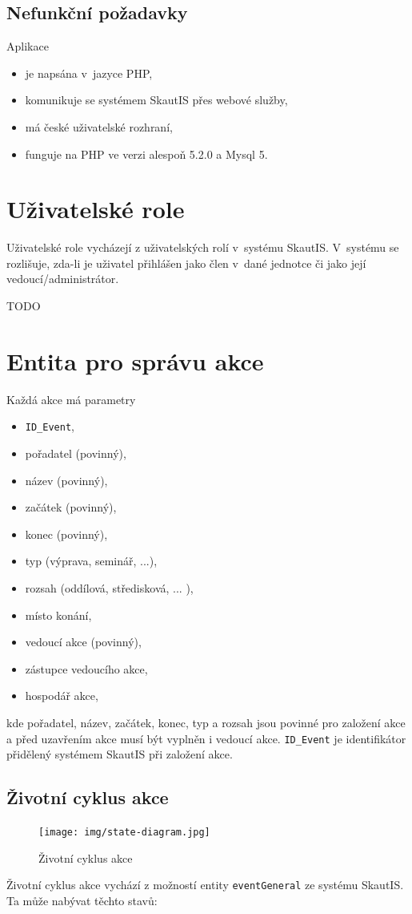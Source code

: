 \documentclass[thesis=B,czech]{FITthesis}[2011/06/14]
\begin{document}
\subsection{Nefunkční požadavky}
Aplikace 
\begin{itemize}
	\item je napsána v~jazyce PHP,
	\item komunikuje se systémem SkautIS přes webové služby,
	\item má české uživatelské rozhraní,
	\item funguje na PHP ve verzi alespoň 5.2.0 a Mysql 5.
\end{itemize}

\section{Uživatelské role}
Uživatelské role vycházejí z uživatelských rolí v~systému SkautIS. V~systému se rozlišuje, zda-li je uživatel přihlášen jako člen v~dané jednotce či jako její vedoucí/administrátor.

TODO

\section{Entita pro správu akce}
\label{sec:eventDescription}
Každá akce má parametry
\begin{itemize}
	\item \texttt{ID\_Event},
	\item pořadatel (povinný),
	\item název (povinný),
	\item začátek (povinný),
	\item konec (povinný),
	\item typ (výprava, seminář, ...),
	\item rozsah (oddílová, středisková, ... ),
	\item místo konání,
	\item vedoucí akce (povinný),
	\item zástupce vedoucího akce,
	\item hospodář akce,
\end{itemize}
kde pořadatel, název, začátek, konec, typ a rozsah jsou povinné pro založení akce a před uzavřením akce musí být vyplněn i vedoucí akce. \texttt{ID\_Event} je identifikátor přidělený systémem SkautIS při založení akce.

\subsection{Životní cyklus akce}
 \begin{figure}[h] \centering
 	\texttt{[image: img/state-diagram.jpg]}
 	\caption[Životní cyklus akce]{Životní cyklus akce}\label{fig:state-diagram}
 \end{figure}
 Životní cyklus akce vychází z možností entity \texttt{eventGeneral} ze systému SkautIS. Ta může nabývat těchto stavů:
 
\end{document}

